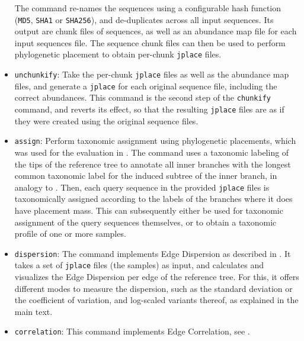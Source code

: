 \begin{itemize}
          The command re-names the sequences using a configurable hash function (\texttt{MD5}, \texttt{SHA1} or \texttt{SHA256}),
          and de-duplicates across all input sequences.
          Its output are chunk files of sequences, as well as an abundance map file for each input sequences file.
          The sequence chunk files can then be used to perform phylogenetic placement
          to obtain per-chunk \texttt{jplace} files.
    \item \texttt{unchunkify}: Take the per-chunk \texttt{jplace} files as well as the abundance map files,
          and generate a \texttt{jplace} for each original sequence file, including the correct abundances.
          This command is the second step of the \texttt{chunkify} command, and reverts its effect,
          so that the resulting \texttt{jplace} files are as if they were created using the original sequence files.
    \item \texttt{assign}: Perform taxonomic assignment using phylogenetic placements,
          which was used for the evaluation in .
          The command uses a taxonomic labeling of the tips of the reference tree
          to annotate all inner branches with the longest common taxonomic label
          for the induced subtree of the inner branch, in analogy to  \cite{Kozlov2016}.
          Then, each query sequence in the provided \texttt{jplace} files
          is taxonomically assigned according to the labels of the branches where it does have placement mass.
          This can subsequently either be used for taxonomic assignment of the query sequences themselves,
          or to obtain a taxonomic profile of one or more samples.
    \item \texttt{dispersion}: The command implements Edge Dispersion
          as described in .
          It takes a set of \texttt{jplace} files (the samples) as input, and calculates and visualizes
          the Edge Dispersion per edge of the reference tree.
          For this, it offers different modes to measure the dispersion, such as the standard deviation
          or the coefficient of variation, and log-scaled variants thereof, as explained in the main text.
    \item \texttt{correlation}: This command implements Edge Correlation,
          see .

\end{itemize}
